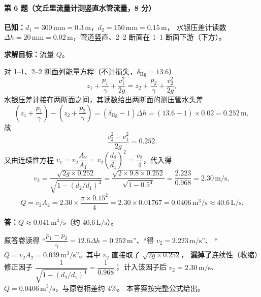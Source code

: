 \paragraph{第 6 题（文丘里流量计测竖直水管流量，8 分）}
\begin{jie}
\textbf{已知：}$d_1=300\,\mathrm{mm}=0.3\,\mathrm{m}$，$d_2=150\,\mathrm{mm}=0.15\,\mathrm{m}$，
水银压差计读数 $\Delta h=20\,\mathrm{mm}=0.02\,\mathrm{m}$，管道竖直、2--2 断面在 1--1 断面下游（下方）。

\textbf{求解目标：}流量 $Q$。

对 1--1、2--2 断面列能量方程（不计损失，$\delta_{\mathrm{Hg}}=13.6$）
\[
z_1+\frac{p_1}{\gamma}+\frac{v_1^{2}}{2g}
=z_2+\frac{p_2}{\gamma}+\frac{v_2^{2}}{2g},
\]
水银压差计接在两断面之间，其读数给出两断面的测压管水头差
\[
\left(z_1+\frac{p_1}{\gamma}\right)-\left(z_2+\frac{p_2}{\gamma}\right)
=(\delta_{\mathrm{Hg}}-1)\Delta h=(13.6-1)\times0.02=0.252\,\mathrm{m},
\]
故
\[
\frac{v_2^{2}-v_1^{2}}{2g}=0.252 .
\]
又由连续性方程
$v_1=v_2\dfrac{A_2}{A_1}=v_2\left(\dfrac{d_2}{d_1}\right)^{2}=\dfrac{v_2}{4}$，代入得
\[
v_2=\frac{\sqrt{2g\times0.252}}{\sqrt{1-\left(d_2/d_1\right)^{4}}}
=\frac{\sqrt{2\times9.8\times0.252}}{\sqrt{1-0.5^{4}}}
=\frac{2.223}{0.968}=2.30\,\mathrm{m/s},
\]
\[
Q=v_2A_2=2.30\times\frac{\pi\times0.15^{2}}{4}
=2.30\times0.01767=0.0406\,\mathrm{m^{3}/s}\approx40.6\,\mathrm{L/s}.
\]

\textbf{答：}$Q\approx0.041\,\mathrm{m^{3}/s}$（约 $40.6\,\mathrm{L/s}$）。
\end{jie}

\begin{tishi}
原答卷读得 ``$\dfrac{p_1-p_2}{\gamma}=12.6\Delta h=0.252\,\mathrm{m}$''、``得 $v_2=2.223\,\mathrm{m/s}$''、
``$Q=v_2A_2=0.039\,\mathrm{m^{3}/s}$''。其中 $v_2$ 直接取了 $\sqrt{2g\times0.252}$，
\textbf{漏掉了}连续性（收缩）修正因子 $\dfrac{1}{\sqrt{1-(d_2/d_1)^{4}}}=\dfrac{1}{0.968}$；
计入该因子后 $v_2=2.30\,\mathrm{m/s}$、$Q=0.0406\,\mathrm{m^{3}/s}$，与原卷相差约 $4\%$。
本答案按完整公式给出。
\end{tishi}

